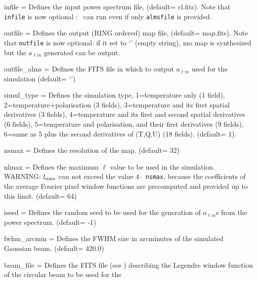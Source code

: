 \begin{qualifiers}
  \begin{qulistwide}{} %
    \item[{infile = }]%
 Defines the input power spectrum file,
	(default= cl.fits). Note that {\tt infile} is now optional :
    \thedocid\ can run even if only {\tt almsfile} is provided.
    \item[{outfile = }]%
 Defines the output (RING ordered) map file,
(default= map.fits). Note that {\tt outfile} is now optional: if it set to 
      `' (empty string),  mo map is synthesized but the $a_{\ell m}$ generated can be output.
    \item[{outfile\_alms = }]%
 Defines the FITS file in which to output $a_{\ell m}$ used
      for the simulation (default= `')
     \item[{simul\_type = }]%
 Defines the simulation type, 1=temperature only (1 field),
       2=temperature+polarisation (3 fields), 3=temperature and its first
spatial derivatives (3 fields),
       4=temperature and its first and second spatial derivatives (6 fields), 5=temperature
       and polarisation, and their first derivatives (9 fields), 6=same as 5
       plus the second derivatives of (T,Q,U) (18 fields).
(default= 1).
    \item[{nsmax = }]%
 Defines the resolution of the map.
(default= 32)
     \item[{nlmax = }]%
 Defines the maximum $\ell$ value 
to be used in the simulation. WARNING: $l_{\textrm{max}}$ can not exceed
the value $4\cdot$ {\tt nsmax}, because the coefficients of the  average Fourier 
pixel window functions
are precomputed and provided up to this limit.
(default= 64)
      \item[{iseed = }]%
 Defines the random seed to be used 
for the generation of $a_{\ell m}$s from the power spectrum.
(default= -1)
    \item[{fwhm\_arcmin = }]%
 Defines the FWHM size in arcminutes 
of the simulated Gaussian beam.
(default= 420.0)
%
    \item[{beam\_file = }]%
 Defines the FITS file (see ) describing the
    Legendre window
    function of the circular beam to be used for the

\end{qulistwide}
\end{qualifiers}
